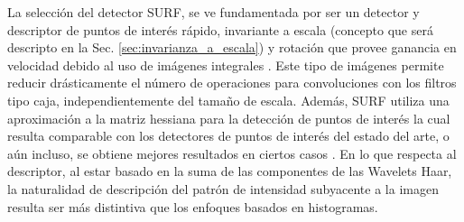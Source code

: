   La selección del detector SURF, se ve fundamentada por ser un detector y descriptor de puntos de interés rápido, invariante a escala (concepto que será descripto en la Sec. \ref{sec:invarianza_a_escala}) y rotación que provee ganancia en velocidad debido al uso de imágenes integrales \cite{Bay:2008:SRF}. Este tipo de imágenes permite reducir drásticamente el número de operaciones para convoluciones con los filtros tipo caja, independientemente del tamaño de escala. Además, SURF utiliza una aproximación a la matriz hessiana para la detección de puntos de interés la cual resulta comparable con los detectores de puntos de interés del estado del arte, o aún incluso, se obtiene mejores resultados en ciertos casos \cite{Bay:2008:SRF}. %
  En lo que respecta al descriptor, al estar basado en la suma de las componentes de las Wavelets Haar, la naturalidad de descripción del patrón de intensidad subyacente a la imagen resulta ser más distintiva que los enfoques basados en histogramas. %

